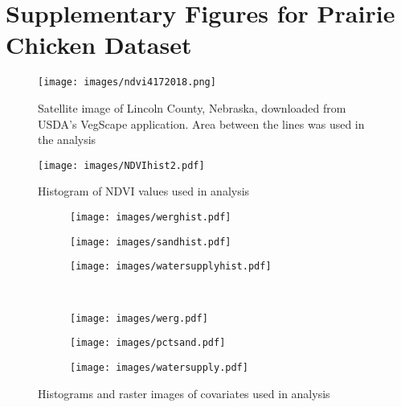 \documentclass[12pt, a4paper, twoside]{article}
\begin{document}
\section{Supplementary Figures for Prairie Chicken Dataset} \label{ChickenData}
\begin{figure}[H]
	\centering
		\texttt{[image: images/ndvi4172018.png]}
	\caption[Satellite image of Lincoln County, NE]{Satellite image of Lincoln County, Nebraska, downloaded from USDA's VegScape application. Area between the lines was used in the analysis}
\end{figure}
		\vspace{.5cm}
\begin{figure}[H] \label{NDVIhist}
	\centering
	\texttt{[image: images/NDVIhist2.pdf]}
	\caption{Histogram of NDVI values used in analysis}
\end{figure}
\begin{figure}[ht]
\centering
\begin{subfigure}{0.3\textwidth}
		\texttt{[image: images/werghist.pdf]}
\end{subfigure}
\begin{subfigure}{0.3\textwidth}
	\texttt{[image: images/sandhist.pdf]}
\end{subfigure}
\begin{subfigure}{0.3\textwidth}
	\texttt{[image: images/watersupplyhist.pdf]}
\end{subfigure}
\\
\begin{subfigure}{0.33\textwidth}
	\texttt{[image: images/werg.pdf]}
\end{subfigure}
\begin{subfigure}{0.3\textwidth}
	\texttt{[image: images/pctsand.pdf]}
\end{subfigure}
\begin{subfigure}{0.3\textwidth}
	\texttt{[image: images/watersupply.pdf]}
\end{subfigure}
	\caption{Histograms and raster images of covariates used in analysis}
\end{figure}
\end{document}
